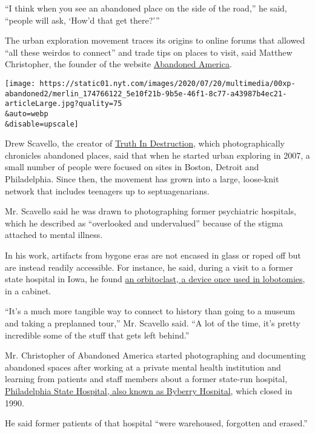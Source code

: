 ``I think when you see an abandoned place on the side of the road,'' he
said, ``people will ask, `How'd that get there?'''

The urban exploration movement traces its origins to online forums that
allowed ``all these weirdos to connect'' and trade tips on places to
visit, said Matthew Christopher, the founder of the website
\href{https://www.abandonedamerica.us/}{Abandoned America}.

\texttt{[image: https://static01.nyt.com/images/2020/07/20/multimedia/00xp-abandoned2/merlin\_174766122\_5e10f21b-9b5e-46f1-8c77-a43987b4ec21-articleLarge.jpg?quality=75\\\&auto=webp\\\&disable=upscale]}

Drew Scavello, the creator of
\href{https://www.facebook.com/pg/truthindestructionphotography/photos/}{Truth
In Destruction}, which photographically chronicles abandoned places,
said that when he started urban exploring in 2007, a small number of
people were focused on sites in Boston, Detroit and Philadelphia. Since
then, the movement has grown into a large, loose-knit network that
includes teenagers up to septuagenarians.

Mr. Scavello said he was drawn to photographing former psychiatric
hospitals, which he described as ``overlooked and undervalued'' because
of the stigma attached to mental illness.

In his work, artifacts from bygone eras are not encased in glass or
roped off but are instead readily accessible. For instance, he said,
during a visit to a former state hospital in Iowa, he found
\href{https://warehouse-13-artifact-database.fandom.com/wiki/Walter_Freeman\%27s_Orbitoclast}{an
orbitoclast, a device once used in lobotomies}, in a cabinet.

``It's a much more tangible way to connect to history than going to a
museum and taking a preplanned tour,'' Mr. Scavello said. ``A lot of the
time, it's pretty incredible some of the stuff that gets left behind.''

Mr. Christopher of Abandoned America started photographing and
documenting abandoned spaces after working at a private mental health
institution and learning from patients and staff members about a former
state-run hospital,
\href{https://www.phillymag.com/news/2015/06/28/byberry-mental-institution-survivors/}{Philadelphia
State Hospital, also known as Byberry Hospital}, which closed in 1990.

He said former patients of that hospital ``were warehoused, forgotten
and erased.''

